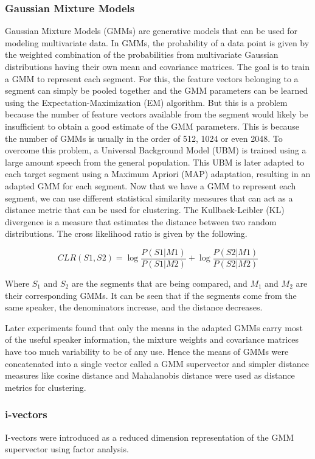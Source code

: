		\subsubsection{Gaussian Mixture Models}
		Gaussian Mixture Models (GMMs) are generative models that can be used for modeling multivariate data. In GMMs, the probability of a data point is given by the weighted combination of the probabilities from multivariate Gaussian distributions having their own mean and covariance matrices.
		The goal is to train a GMM to represent each segment. For this, the feature vectors belonging to a segment can simply be pooled together and the GMM parameters can be learned using the Expectation-Maximization (EM) algorithm. But this is a problem because the number of feature vectors available from the segment would likely be insufficient to obtain a good estimate of the GMM parameters. This is because the number of GMMs is usually in the order of 512, 1024 or even 2048. To overcome this problem, a Universal Background Model (UBM) is trained using a large amount speech from the general population. This UBM is later adapted to each target segment using a Maximum Apriori (MAP) adaptation, resulting in an adapted GMM for each segment.
		Now that we have a GMM to represent each segment, we can use different statistical similarity measures that can act as a distance metric that can be used for clustering. The Kullback-Leibler (KL) divergence is a measure that estimates the distance between two random distributions. The cross likelihood ratio is given by the following.
		
		$$ CLR(S1, S2) = \log\frac{P(S1|M1)}{P(S1|M2)} + \log\frac{P(S2|M1)}{P(S2|M2)} $$
		
		Where $S_1$ and $S_2$ are the segments that are being compared, and $M_1$ and $M_2$ are their corresponding GMMs. It can be seen that if the segments come from the same speaker, the denominators increase, and the distance decreases.
		
		Later experiments found that only the means in the adapted GMMs carry most of the useful speaker information, the mixture weights and covariance matrices have too much variability to be of any use. Hence the means of GMMs were concatenated into a single vector called a GMM supervector and simpler distance measures like cosine distance and Mahalanobis distance were used as distance metrics for clustering.

		\subsubsection{i-vectors}
		I-vectors were introduced as a reduced dimension representation of the GMM supervector using factor analysis.
		
